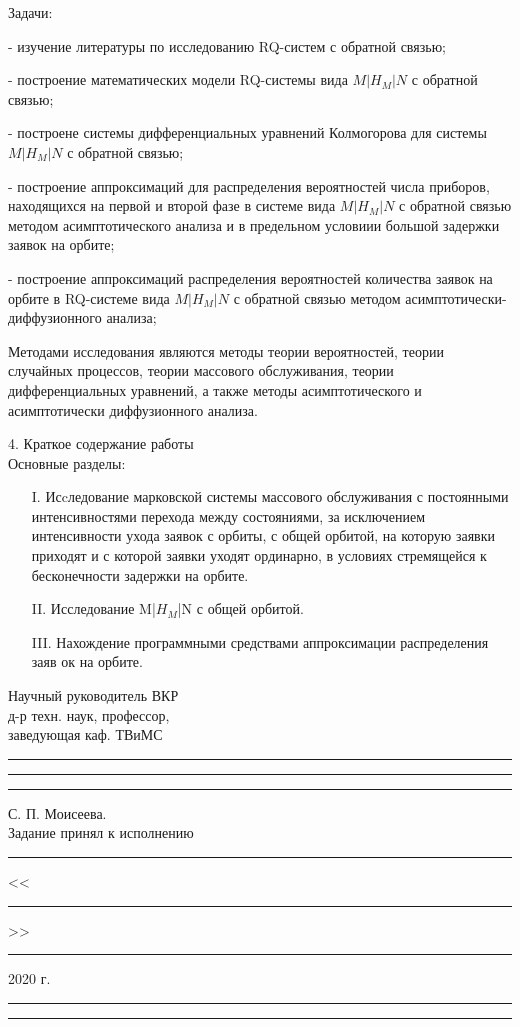 Задачи:

- изучение литературы по исследованию RQ-систем с обратной связью;

- построение математических модели RQ-системы вида $M|H_M|N$ с обратной связью;

- построене системы дифференциальных уравнений Колмогорова для системы $M|H_M|N$ с обратной связью;

- построение аппроксимаций для распределения вероятностей числа приборов, находящихся на первой и второй фазе в системе вида $M|H_M|N$ с обратной связью методом асимптотического анализа и в предельном условиии большой задержки заявок на орбите;

- построение аппроксимаций распределения вероятностей количества заявок на орбите в RQ-системе вида $M|H_M|N$ с обратной связью методом асимптотически-диффузионного анализа;

Методами исследования являются методы теории вероятностей, теории случайных процессов, теории массового обслуживания, теории дифференциальных уравнений, а также методы асимптотического и асимптотически диффузионного анализа.

\thispagestyle{empty}
4. Краткое содержание работы\\
\hspace*{\parindent}%
Основные разделы:
\begin{itemize}
	\item[I.] Исcледование марковской системы массового обслуживания с постоянными интенсивностями перехода между состояниями, за исключением интенсивности ухода заявок с орбиты, с общей орбитой, на которую заявки приходят и с которой заявки уходят ординарно, в условиях стремящейся к бесконечности задержки на орбите.
	\item[II.] Исследование M|$H_M$|N с общей орбитой.
	\item[III.] Нахождение программными средствами аппроксимации распределения заяв
ок на орбите.
\end{itemize}


\noindent Научный руководитель ВКР\\
\noindent д-р техн. наук, профессор,\\
\noindent заведующая каф. ТВиМС\rule{30mm}{0pt}\rule{30mm}{0.4pt}\rule{30mm}{0pt} С. П. Моисеева.\\

\noindent Задание принял к исполнению\rule{10mm}{0pt}<<\rule{10mm}{0.4pt}>>\rule{25mm}{0.4pt} 2020 г.\rule{10mm}{0pt}\rule{23mm}{0.4pt}\\
